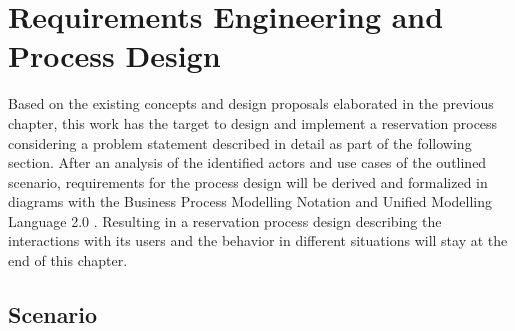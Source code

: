 
\chapter{Requirements Engineering and Process Design}
\label{ch:Requirements Engineering and Process Design}

Based on the existing concepts and design proposals elaborated in the previous chapter, this work has the target to design and implement a reservation process considering a problem statement described in detail as part of the following section. 
After an analysis of the identified actors and use cases of the outlined scenario, requirements for the process design will be derived and formalized in diagrams with the Business Process Modelling Notation \cite{noauthor_bpmn_nodate} and Unified Modelling Language 2.0 \cite{noauthor_welcome_nodate}.
Resulting in a reservation process design describing the interactions with its users and the behavior in different situations will stay at the end of this chapter. 

\section{Scenario}
\label{ch:Requirements Engineering and Process Design:sec:Scenario}

